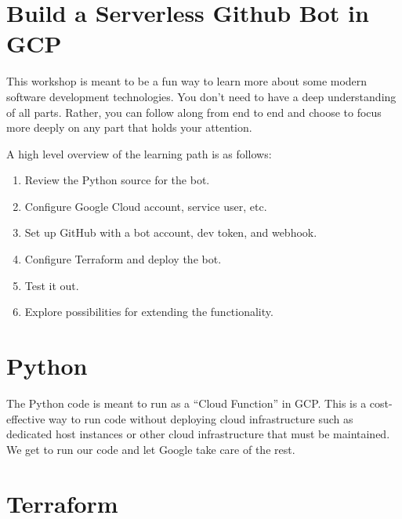 







\section{\label{sec:Start}Build a Serverless Github Bot in GCP}
\vspace{2mm}

\justifying
This workshop is meant to be a fun way to learn more about some modern software development technologies. You don't need to have a deep understanding of all parts. Rather, you can follow along from end to end and choose to focus more deeply on any part that holds your attention.

\justifying
A high level overview of the learning path is as follows:

\begin{raggedright}
	\begin{enumerate}
		\item Review the Python source for the bot.
		\item Configure Google Cloud account, service user, etc.
		\item Set up GitHub with a bot account, dev token, and webhook.
		\item Configure Terraform and deploy the bot.
		\item Test it out.
		\item Explore possibilities for extending the functionality.
	\end{enumerate}
\end{raggedright}
\vspace{2mm}

\section{\label{sec:Python}Python}

\justifying
The Python code is meant to run as a ``Cloud Function'' in GCP. This is a cost-effective way to run code without deploying cloud infrastructure such as dedicated host instances or other cloud infrastructure that must be maintained. We get to run our code and let Google take care of the rest.

\section{\label{sec:Terraform}Terraform}




% 
% 


